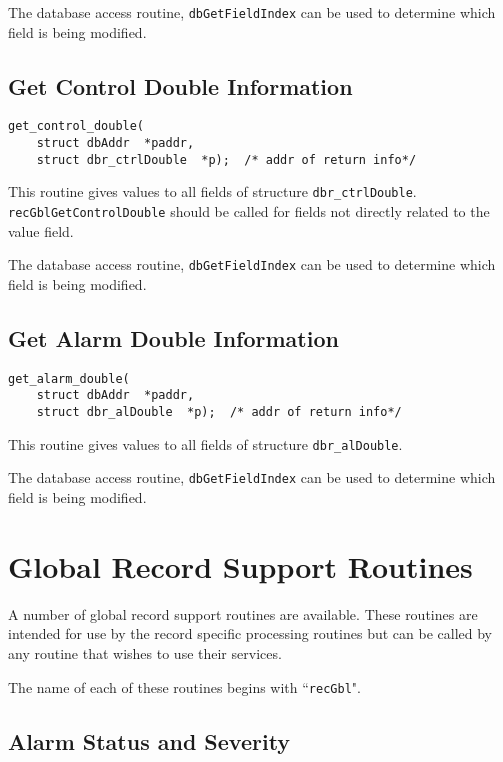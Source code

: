 The database access routine, \verb|dbGetFieldIndex| can be used to determine which field is being modified.

\subsection{Get Control Double Information}

\begin{verbatim}
get_control_double(
    struct dbAddr  *paddr,
    struct dbr_ctrlDouble  *p);  /* addr of return info*/
\end{verbatim}

This routine gives values to all fields of structure \verb|dbr_ctrlDouble|. \verb|recGblGetControlDouble| should be called 
for fields not directly related to the value field.

The database access routine, \verb|dbGetFieldIndex| can be used to determine which field is being modified.

\subsection{Get Alarm Double Information}

\begin{verbatim}
get_alarm_double(
    struct dbAddr  *paddr,
    struct dbr_alDouble  *p);  /* addr of return info*/
\end{verbatim}

This routine gives values to all fields of structure \verb|dbr_alDouble|.

The database access routine, \verb|dbGetFieldIndex| can be used to determine which field is being modified.

\section{Global Record Support Routines}

A number of global record support routines are available. These routines are intended for use by the record specific 
processing routines but can be called by any routine that wishes to use their services.

The name of each of these routines begins with ``\verb|recGbl|".

\subsection{Alarm Status and Severity}

